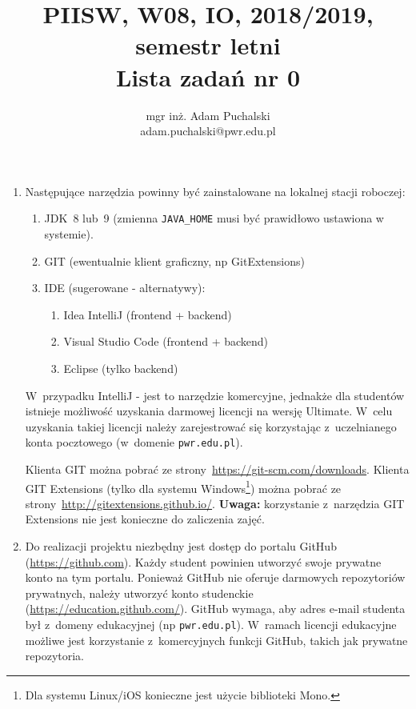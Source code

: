 \documentclass[12pt]{article}
\title{PIISW, W08, IO, 2018/2019, semestr letni\\Lista zadań nr 0}
\author{mgr inż. Adam Puchalski\\\small{adam.puchalski@pwr.edu.pl}}
\begin{document}
    \maketitle

    \begin{enumerate}
        \item Następujące narzędzia powinny być zainstalowane na lokalnej stacji roboczej:
            \begin{enumerate}
                \item JDK~8 lub~9 (zmienna \texttt{JAVA\_HOME} musi być prawidłowo ustawiona w systemie).
                \item GIT (ewentualnie klient graficzny, np GitExtensions)
                \item IDE (sugerowane - alternatywy):
                    \begin{enumerate}
                        \item Idea IntelliJ (frontend + backend)
                        \item Visual Studio Code (frontend + backend)
                        \item Eclipse (tylko backend)
                    \end{enumerate}
            \end{enumerate}
            
            W~przypadku IntelliJ - jest to narzędzie komercyjne, jednakże dla studentów istnieje możliwość uzyskania darmowej licencji na wersję Ultimate. W~celu uzyskania takiej licencji należy zarejestrować się korzystając z~uczelnianego konta pocztowego (w~domenie \texttt{pwr.edu.pl}).

            Klienta GIT można pobrać ze strony~\url{https://git-scm.com/downloads}. Klienta GIT Extensions (tylko dla systemu Windows\footnote{Dla systemu Linux/iOS konieczne jest użycie biblioteki Mono.}) można pobrać ze strony~\url{http://gitextensions.github.io/}. \textbf{Uwaga:} korzystanie z~narzędzia GIT Extensions nie jest konieczne do zaliczenia zajęć.

        \item Do realizacji projektu niezbędny jest dostęp do portalu GitHub (\url{https://github.com}). Każdy student powinien utworzyć swoje prywatne konto na tym portalu. Ponieważ GitHub nie oferuje darmowych repozytoriów prywatnych, należy utworzyć konto studenckie (\url{https://education.github.com/}). GitHub wymaga, aby adres e-mail studenta był z~domeny edukacyjnej (np \texttt{pwr.edu.pl}). W~ramach licencji edukacyjne możliwe jest korzystanie z~komercyjnych funkcji GitHub, takich jak prywatne repozytoria.


\end{enumerate}
\end{document}
